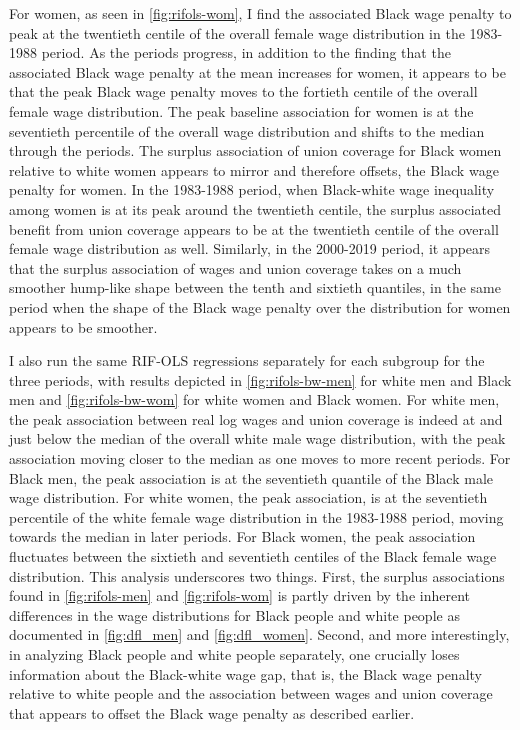 \documentclass[11pt]{article}
\begin{document}
For women, as seen in \autoref{fig:rifols-wom}, I find the associated Black wage penalty to peak at the twentieth centile of the overall female wage distribution in the 1983-1988 period. As the periods progress, in addition to the finding that the associated Black wage penalty at the mean increases for women, it appears to be that the peak Black wage penalty moves to the fortieth centile of the overall female wage distribution. The peak baseline association for women is at the seventieth percentile of the overall wage distribution and shifts to the median through the periods. The surplus association of union coverage for Black women relative to white women appears to mirror and therefore offsets, the Black wage penalty for women. In the 1983-1988 period, when Black-white wage inequality among women is at its peak around the twentieth centile, the surplus associated benefit from union coverage appears to be at the twentieth centile of the overall female wage distribution as well. Similarly, in the 2000-2019 period, it appears that the surplus association of wages and union coverage takes on a much smoother hump-like shape between the tenth and sixtieth quantiles, in the same period when the shape of the Black wage penalty over the distribution for women appears to be smoother. 

I also run the same RIF-OLS regressions separately for each subgroup for the three periods, with results depicted in \autoref{fig:rifols-bw-men} for white men and Black men and \autoref{fig:rifols-bw-wom} for white women and Black women. For white men, the peak association between real log wages and union coverage is indeed at and just below the median of the overall white male wage distribution, with the peak association moving closer to the median as one moves to more recent periods. For Black men, the peak association is at the seventieth quantile of the Black male wage distribution. For white women, the peak association, is at the seventieth percentile of the white female wage distribution in the 1983-1988 period, moving towards the median in later periods. For Black women, the peak association fluctuates between the sixtieth and seventieth centiles of the Black female wage distribution. This analysis underscores two things. First, the surplus associations found in \autoref{fig:rifols-men} and \autoref{fig:rifols-wom} is partly driven by the inherent differences in the wage distributions for Black people and white people as documented in \autoref{fig:dfl_men} and \autoref{fig:dfl_women}. Second, and more interestingly, in analyzing Black people and white people separately, one crucially loses information about the Black-white wage gap, that is, the Black wage penalty relative to white people and the association between wages and union coverage that appears to offset the Black wage penalty as described earlier. 
\end{document}
